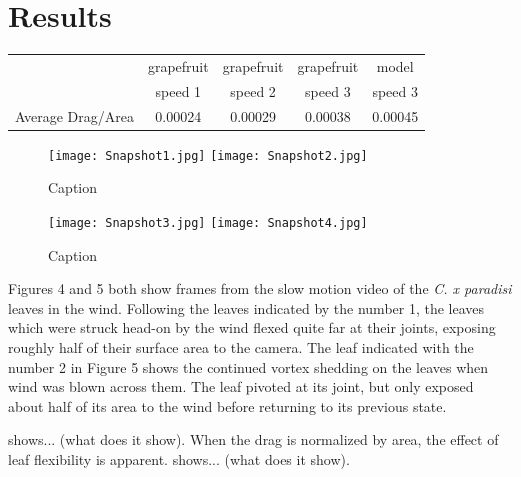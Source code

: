 \documentclass[]{article}
\begin{document}
\section{Results}
\begin{tabular}{ccccc}
      & grapefruit & grapefruit & grapefruit & model \\
      & speed 1 & speed 2 & speed 3 & speed 3 \\
     Average Drag/Area & 0.00024 & 0.00029 & 0.00038 & 0.00045

\end{tabular}
\begin{figure}
    \centering
    \texttt{[image: Snapshot1.jpg]}
    \texttt{[image: Snapshot2.jpg]}
    \caption{Caption}
    \label{fig:results1}
\end{figure}
\begin{figure}
    \centering
    \texttt{[image: Snapshot3.jpg]}
    \texttt{[image: Snapshot4.jpg]}
    \caption{Caption}
    \label{fig:results2}
\end{figure}
	Figures 4 and 5 both show frames from the slow motion video of the \emph{C. x paradisi} leaves in the wind. Following the leaves indicated by the number 1, the leaves which were struck head-on by the wind flexed quite far at their joints, exposing roughly half of their surface area to the camera. The leaf indicated with the number 2 in Figure 5 shows the continued vortex shedding on the leaves when wind was blown across them. The leaf pivoted at its joint, but only exposed about half of its area to the wind before returning to its previous state.

 shows... (what does it show). When the drag is normalized by area, the effect of leaf flexibility is apparent.  shows... (what does it show). 
\end{document}
